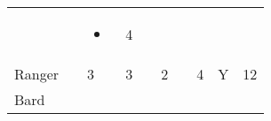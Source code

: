 \documentclass[12pt]{article}
\newcommand{\indexClass}[1]{\index{#1}}
\newcommand{\class}[1]{#1\indexClass{#1}}
\begin{document}
\begin{longtable}[]{@{}llllllllll@{}}
\begin{minipage}[t]{0.06\columnwidth}\raggedright\strut
\strut\end{minipage} &
\begin{minipage}[t]{0.06\columnwidth}\raggedright\strut
\strut\end{minipage} &
\begin{minipage}[t]{0.07\columnwidth}\raggedright\strut
\begin{itemize}
\item
\end{itemize}
\strut\end{minipage} &
\begin{minipage}[t]{0.08\columnwidth}\raggedright\strut
4
\strut\end{minipage}\tabularnewline
\begin{minipage}[t]{0.13\columnwidth}\raggedright\strut
\class{Ranger}
\strut\end{minipage} &
\begin{minipage}[t]{0.06\columnwidth}\raggedright\strut
\strut\end{minipage} &
\begin{minipage}[t]{0.06\columnwidth}\raggedright\strut
3
\strut\end{minipage} &
\begin{minipage}[t]{0.06\columnwidth}\raggedright\strut
3
\strut\end{minipage} &
\begin{minipage}[t]{0.06\columnwidth}\raggedright\strut
\strut\end{minipage} &
\begin{minipage}[t]{0.06\columnwidth}\raggedright\strut
2
\strut\end{minipage} &
\begin{minipage}[t]{0.06\columnwidth}\raggedright\strut
\strut\end{minipage} &
\begin{minipage}[t]{0.06\columnwidth}\raggedright\strut
4
\strut\end{minipage} &
\begin{minipage}[t]{0.07\columnwidth}\raggedright\strut
Y
\strut\end{minipage} &
\begin{minipage}[t]{0.08\columnwidth}\raggedright\strut
12
\strut\end{minipage}\tabularnewline
\begin{minipage}[t]{0.13\columnwidth}\raggedright\strut
\class{Bard}
\strut\end{minipage} &

\end{longtable}
\end{document}
